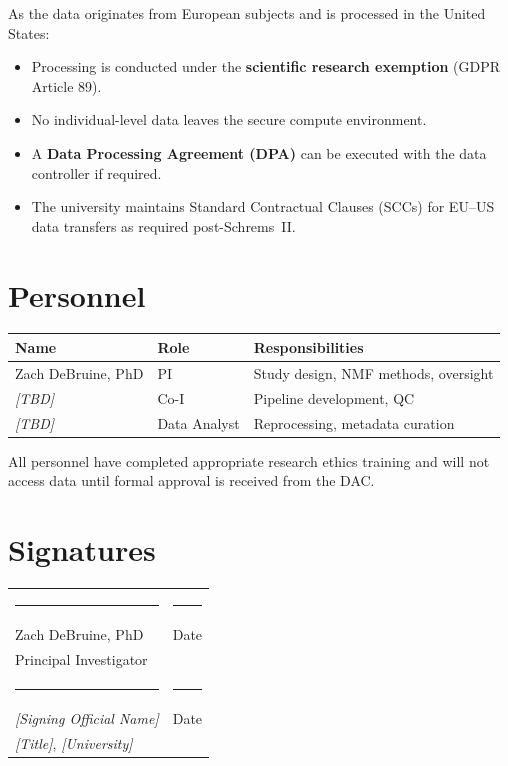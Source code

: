 \documentclass[11pt,a4paper]{article}
\begin{document}
As the data originates from European subjects and is processed in the
United States:
\begin{itemize}[nosep]
    \item Processing is conducted under the \textbf{scientific research
          exemption} (GDPR Article 89).
    \item No individual-level data leaves the secure compute
          environment.
    \item A \textbf{Data Processing Agreement (DPA)} can be executed
          with the data controller if required.
    \item The university maintains Standard Contractual Clauses (SCCs)
          for EU--US data transfers as required post-Schrems~II.
\end{itemize}

\section{Personnel}

\begin{tabular}{@{} l l p{5.5cm} @{}}
\toprule
\textbf{Name} & \textbf{Role} & \textbf{Responsibilities} \\
\midrule
Zach DeBruine, PhD & PI & Study design, NMF methods, oversight \\
\textit{[TBD]} & Co-I & Pipeline development, QC \\
\textit{[TBD]} & Data Analyst & Reprocessing, metadata curation \\
\bottomrule
\end{tabular}

\bigskip
\noindent All personnel have completed appropriate research ethics
training and will not access data until formal approval is received
from the DAC.

\section{Signatures}

\bigskip
\begin{tabular}{@{} p{6cm} p{6cm} @{}}
\rule{5.5cm}{0.4pt} & \rule{5.5cm}{0.4pt} \\
Zach DeBruine, PhD & Date \\
Principal Investigator & \\[1.5cm]
\rule{5.5cm}{0.4pt} & \rule{5.5cm}{0.4pt} \\
\textit{[Signing Official Name]} & Date \\
\textit{[Title]}, \textit{[University]} & \\
\end{tabular}
\end{document}
